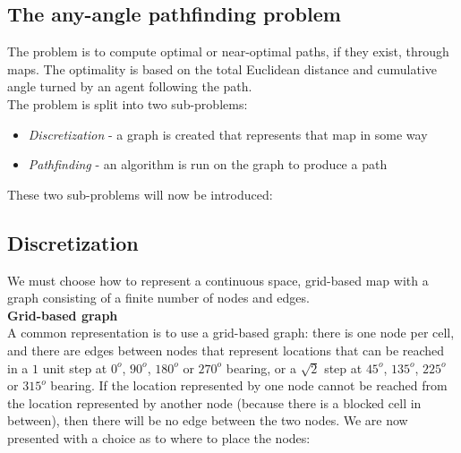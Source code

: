 \documentclass[12pt,twoside,notitlepage]{report}
\begin{document}
\subsection{The any-angle pathfinding problem}

The problem is to compute optimal or near-optimal paths, if they exist, through maps. The optimality is based on the total Euclidean distance and cumulative angle turned by an agent following the path. \\

\noindent
The problem is split into two sub-problems:
\begin{itemize}
\item {\em Discretization} - a graph is created that represents that map in some way
\item {\em Pathfinding} - an algorithm is run on the graph to produce a path
\end{itemize}

These two sub-problems will now be introduced:

\subsection{Discretization}

We must choose how to represent a continuous space, grid-based map with a graph consisting of a finite number of nodes and edges.\\

\noindent
{\bfseries Grid-based graph}\\

\noindent
A common representation is to use a grid-based graph: there is one node per cell, and there are edges between nodes that represent locations that can be reached in a {$1$} unit step at {$0^{o}$}, {$90^{o}$}, {$180^{o}$} or {$270^{o}$} bearing, or a {$\sqrt{2}$} step at {$45^{o}$}, {$135^{o}$}, {$225^{o}$} or {$315^{o}$} bearing. If the location represented by one node cannot be reached from the location represented by another node (because there is a blocked cell in between), then there will be no edge between the two nodes. We are now presented with a choice as to where to place the nodes:
\end{document}
